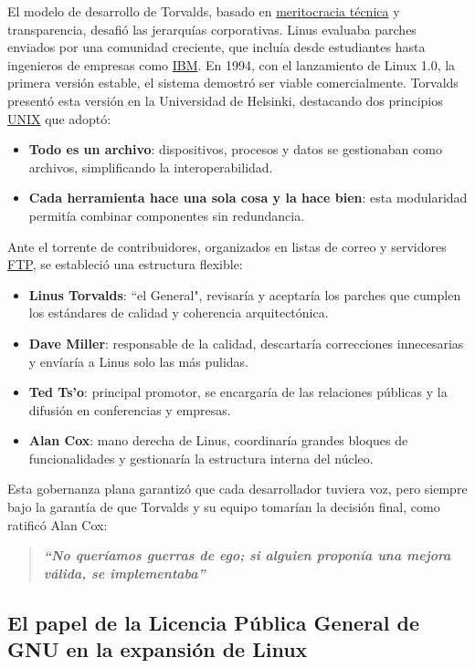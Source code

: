 \documentclass[a4paper,12pt]{article}
\begin{document}
El modelo de desarrollo de Torvalds, basado en \hyperref[meritocracia]{meritocracia técnica} y
transparencia, desafió las jerarquías corporativas. Linus evaluaba parches
enviados por una comunidad creciente, que incluía desde estudiantes hasta
ingenieros de empresas como \hyperref[ibm]{IBM}. En 1994, con el lanzamiento de Linux 1.0, la
primera versión estable, el sistema demostró ser viable comercialmente. Torvalds
presentó esta versión en la Universidad de Helsinki, destacando dos principios
\hyperref[unix]{UNIX} que adoptó:
\begin{itemize}
    \item \textbf{Todo es un archivo}: dispositivos, procesos y datos se
    gestionaban como archivos, simplificando la interoperabilidad.     
    \item \textbf{Cada herramienta hace una sola cosa y la hace bien}:
    esta modularidad permitía combinar componentes sin redundancia.
\end{itemize}
Ante el torrente de contribuidores, organizados en listas de correo y servidores
\hyperref[ftp]{FTP}, se estableció una estructura flexible:
\begin{itemize}
    \item \textbf{Linus Torvalds}: ``el General", revisaría y aceptaría los parches que
    cumplen los estándares de calidad y coherencia arquitectónica. 
    \item \textbf{Dave Miller}: responsable de la calidad, descartaría correcciones
    innecesarias y envíaría a Linus solo las más pulidas.  
    \item \textbf{Ted Ts’o}: principal promotor, se encargaría de las relaciones
    públicas y la difusión en conferencias y empresas.  
    \item \textbf{Alan Cox}: mano derecha de Linus, coordinaría grandes bloques de
    funcionalidades y gestionaría la estructura interna del núcleo.
\end{itemize} 

Esta gobernanza plana garantizó que cada desarrollador tuviera voz, pero siempre
bajo la garantía de que Torvalds y su equipo tomarían la decisión final, como ratificó Alan Cox:
\begin{quote}
    \textbf{\textit{“No queríamos guerras de ego; si alguien proponía una mejora válida, se
    implementaba”}} 
\end{quote}
\newpage

\subsection{El papel de la Licencia Pública General de GNU en la expansión de Linux}
\end{document}
